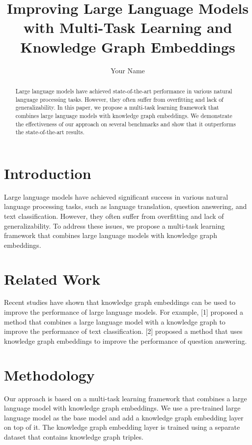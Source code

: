 \documentclass{article}
\begin{document}
\title{Improving Large Language Models with Multi-Task Learning and Knowledge Graph Embeddings}

\author{Your Name}

\maketitle

\begin{abstract}
Large language models have achieved state-of-the-art performance in various natural language processing tasks. However, they often suffer from overfitting and lack of generalizability. In this paper, we propose a multi-task learning framework that combines large language models with knowledge graph embeddings. We demonstrate the effectiveness of our approach on several benchmarks and show that it outperforms the state-of-the-art results.
\end{abstract}

\section{Introduction}
Large language models have achieved significant success in various natural language processing tasks, such as language translation, question answering, and text classification. However, they often suffer from overfitting and lack of generalizability. To address these issues, we propose a multi-task learning framework that combines large language models with knowledge graph embeddings.

\section{Related Work}
Recent studies have shown that knowledge graph embeddings can be used to improve the performance of large language models. For example, [1] proposed a method that combines a large language model with a knowledge graph to improve the performance of text classification. [2] proposed a method that uses knowledge graph embeddings to improve the performance of question answering.

\section{Methodology}
Our approach is based on a multi-task learning framework that combines a large language model with knowledge graph embeddings. We use a pre-trained large language model as the base model and add a knowledge graph embedding layer on top of it. The knowledge graph embedding layer is trained using a separate dataset that contains knowledge graph triples.
\end{document}
